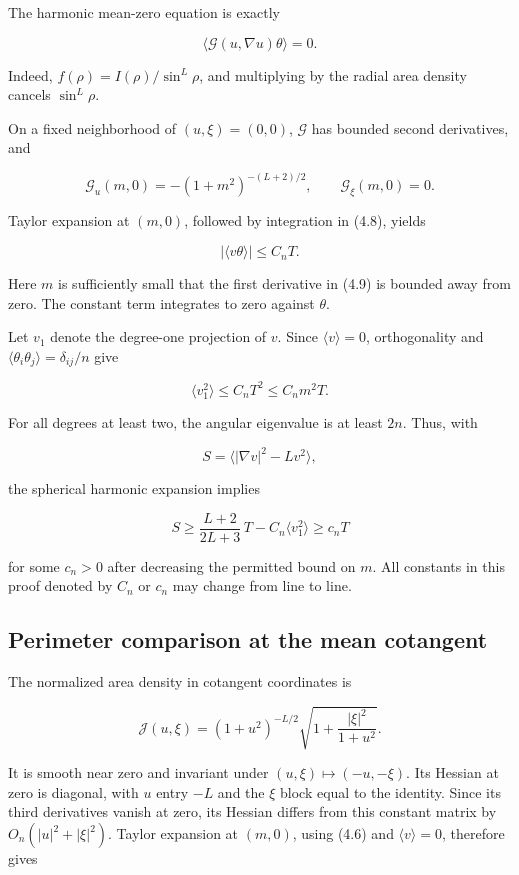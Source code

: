 \documentclass[11pt]{article}
\begin{document}
The harmonic mean-zero equation is exactly

\[
\langle\mathcal G(u,\nabla u)\theta\rangle=0.
\tag{4.8}
\]

Indeed, \(f(\rho)=I(\rho)/\sin^L\rho\), and multiplying by the radial
area density cancels \(\sin^L\rho\).

On a fixed neighborhood of \((u,\xi)=(0,0)\), \(\mathcal G\) has bounded
second derivatives, and

\[
\mathcal G_u(m,0)=-(1+m^2)^{-(L+2)/2},\qquad
\mathcal G_\xi(m,0)=0.
\tag{4.9}
\]

Taylor expansion at \((m,0)\), followed by integration in (4.8), yields

\[
|\langle v\theta\rangle|\leq C_nT.
\tag{4.10}
\]

Here \(m\) is sufficiently small that the first derivative in (4.9) is
bounded away from zero. The constant term integrates to zero against
\(\theta\).

Let \(v_1\) denote the degree-one projection of \(v\). Since
\(\langle v\rangle=0\), orthogonality and
\(\langle\theta_i\theta_j\rangle=\delta_{ij}/n\) give

\[
\langle v_1^2\rangle\leq C_nT^2\leq C_nm^2T.
\tag{4.11}
\]

For all degrees at least two, the angular eigenvalue is at least \(2n\).
Thus, with

\[
S=\langle|\nabla v|^2-Lv^2\rangle,
\tag{4.12}
\]

the spherical harmonic expansion implies

\[
S\geq \frac{L+2}{2L+3}\,T-C_n\langle v_1^2\rangle
\geq c_nT
\tag{4.13}
\]

for some \(c_n>0\) after decreasing the permitted bound on \(m\). All
constants in this proof denoted by \(C_n\) or \(c_n\) may change from
line to line.

\subsection{Perimeter comparison at the mean
cotangent}\label{perimeter-comparison-at-the-mean-cotangent}

The normalized area density in cotangent coordinates is

\[
\mathcal J(u,\xi)
=(1+u^2)^{-L/2}\sqrt{1+\frac{|\xi|^2}{1+u^2}}.
\tag{4.14}
\]

It is smooth near zero and invariant under \((u,\xi)\mapsto(-u,-\xi)\).
Its Hessian at zero is diagonal, with \(u\) entry \(-L\) and the \(\xi\)
block equal to the identity. Since its third derivatives vanish at zero,
its Hessian differs from this constant matrix by \(O_n(|u|^2+|\xi|^2)\).
Taylor expansion at \((m,0)\), using (4.6) and \(\langle v\rangle=0\),
therefore gives
\end{document}
